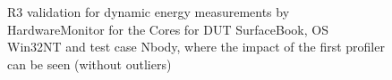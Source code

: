 \begin{figure}
                            \caption{R3 validation for dynamic energy measurements by HardwareMonitor for the Cores for DUT SurfaceBook, OS Win32NT and test case Nbody, where the impact of the first profiler can be seen (without outliers)} \label{fig:SurfaceBook_HardwareMonitor_Cores_R3_dynamic_energy_without_outliers_Win32NT_avg_watts}
                            \end{figure}
                            